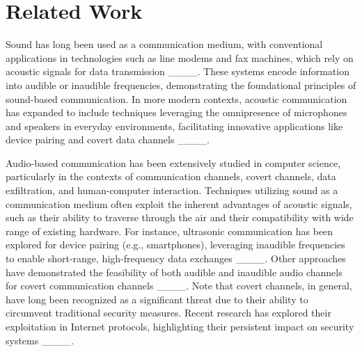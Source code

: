\section{Related Work}
Sound has long been used as a communication medium, with conventional applications in technologies such as line modems and fax machines, which rely on acoustic signals for data transmission ____. These systems encode information into audible or inaudible frequencies, demonstrating the foundational principles of sound-based communication. In more modern contexts, acoustic communication has expanded to include techniques leveraging the omnipresence of microphones and speakers in everyday environments, facilitating innovative applications like device pairing and covert data channels ____. 

Audio-based communication has been extensively studied in computer science, particularly in the contexts of communication channels, covert channels, data exfiltration, and human-computer interaction. Techniques utilizing sound as a communication medium often exploit the inherent advantages of acoustic signals, such as their ability to traverse through the air and their compatibility with wide range of existing hardware. For instance, ultrasonic communication has been explored for device pairing (e.g., smartphones), leveraging inaudible frequencies to enable short-range, high-frequency data exchanges ____. Other approaches have demonstrated the feasibility of both audible and inaudible audio channels for covert communication channels ____. Note that covert channels, in general, have long been recognized as a significant threat due to their ability to circumvent traditional security measures. Recent research has explored their exploitation in Internet protocols, highlighting their persistent impact on security systems ____.


